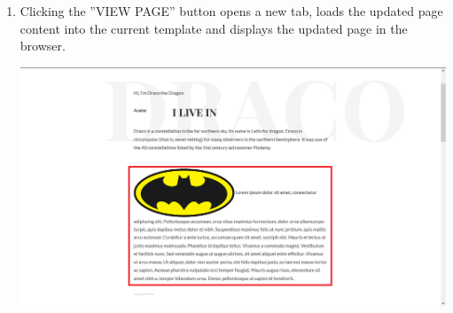 \documentclass[12pt]{article}
\begin{document}
\begin{enumerate}
  \item Clicking the ''VIEW PAGE'' button opens a new tab, loads the updated page content into the current template and displays the updated page in the browser.
  
  \includegraphics[width=\textwidth,height=\textheight,keepaspectratio]{pics/editPage_7.png}
    
\end{enumerate}
\end{document}

